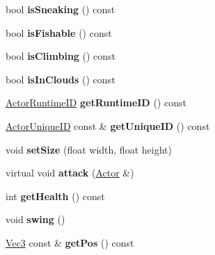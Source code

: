 \begin{DoxyCompactItemize}
\item 
\mbox{\label{struct_actor_ac44b0c83e9e84bf4f169f1991740c758}} 
bool {\bfseries is\+Sneaking} () const
\item 
\mbox{\label{struct_actor_a663af240ed7d3012b1370714be452240}} 
bool {\bfseries is\+Fishable} () const
\item 
\mbox{\label{struct_actor_a27ea866217c4e4d474fcfa58a86478f7}} 
bool {\bfseries is\+Climbing} () const
\item 
\mbox{\label{struct_actor_a756f6cc3b0e9f4b8848e7290e9b4a287}} 
bool {\bfseries is\+In\+Clouds} () const
\item 
\mbox{\label{struct_actor_a6c3f954cad637877af963c721e567586}} 
\mbox{\hyperlink{struct_actor_runtime_i_d}{Actor\+Runtime\+ID}} {\bfseries get\+Runtime\+ID} () const
\item 
\mbox{\label{struct_actor_a2fe949fddfaedccd430565ebc0f69965}} 
\mbox{\hyperlink{struct_actor_unique_i_d}{Actor\+Unique\+ID}} const  \& {\bfseries get\+Unique\+ID} () const
\item 
\mbox{\label{struct_actor_ad432f4c935e76acaa81209b535b6f69d}} 
void {\bfseries set\+Size} (float width, float height)
\item 
\mbox{\label{struct_actor_a10665755fd007fd4818c8ec6d9da2c6f}} 
virtual void {\bfseries attack} (\mbox{\hyperlink{struct_actor}{Actor}} \&)
\item 
\mbox{\label{struct_actor_a02d153452eb8ea3dc2e2de666935471f}} 
int {\bfseries get\+Health} () const
\item 
\mbox{\label{struct_actor_a48dc31bc1644a1d4ecef97a65fcaeabd}} 
void {\bfseries swing} ()
\item 
\mbox{\label{struct_actor_aecd6d59b839588ab3cdffb76e2ed27ec}} 
\mbox{\hyperlink{struct_vec3}{Vec3}} const  \& {\bfseries get\+Pos} () const
\item 
\mbox{\label{struct_actor_a62aadeb18c8a994290fe6d8188c52e6f}} 

\end{DoxyCompactItemize}
